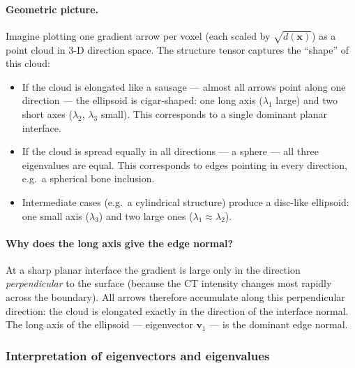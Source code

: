 \documentclass[11pt,a4paper]{article}
\newcommand{\vx}{\mathbf{x}}
\newcommand{\vv}{\mathbf{v}}
\begin{document}
\paragraph{Geometric picture.}
Imagine plotting one gradient arrow per voxel (each scaled by $\sqrt{d(\vx)}$)
as a point cloud in 3-D direction space.
The structure tensor captures the ``shape'' of this cloud:
\begin{itemize}
    \item If the cloud is elongated like a sausage — almost all arrows point
          along one direction — the ellipsoid is cigar-shaped: one long axis
          ($\lambda_1$ large) and two short axes ($\lambda_2$, $\lambda_3$
          small).
          This corresponds to a single dominant planar interface.
    \item If the cloud is spread equally in all directions — a sphere — all
          three eigenvalues are equal.
          This corresponds to edges pointing in every direction, e.g.\ a
          spherical bone inclusion.
    \item Intermediate cases (e.g.\ a cylindrical structure) produce a
          disc-like ellipsoid: one small axis ($\lambda_3$) and two large
          ones ($\lambda_1 \approx \lambda_2$).
\end{itemize}

\paragraph{Why does the long axis give the edge normal?}
At a sharp planar interface the gradient is large only in the direction
\emph{perpendicular} to the surface (because the CT intensity changes most
rapidly across the boundary).
All arrows therefore accumulate along this perpendicular direction: the cloud
is elongated exactly in the direction of the interface normal.
The long axis of the ellipsoid — eigenvector $\vv_1$ — is the dominant edge
normal.

\subsubsection*{Interpretation of eigenvectors and eigenvalues}
\end{document}
